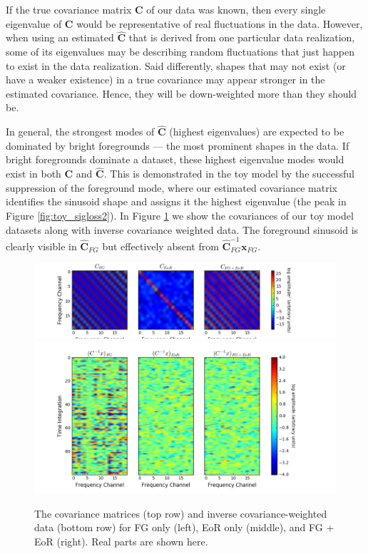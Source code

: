 \documentclass[preprint2,numberedappendix,tighten]{aastex6}  %
\begin{document}
If the true covariance matrix $\textbf{C}$ of our data was known, then every single eigenvalue of $\textbf{C}$ would be representative of real fluctuations in the data. However, when using an estimated $\hat{\textbf{C}}$ that is derived from one particular data realization, some of its eigenvalues may be describing random fluctuations that just happen to exist in the data realization. Said differently, shapes that may not exist (or have a weaker existence) in a true covariance may appear stronger in the estimated covariance. Hence, they will be down-weighted more than they should be.

In general, the strongest modes of $\hat{\textbf{C}}$ (highest eigenvalues) are expected to be dominated by bright foregrounds --- the most prominent shapes in the data. If bright foregrounds dominate a dataset, these highest eigenvalue modes would exist in both $\textbf{C}$ and $\hat{\textbf{C}}$. This is demonstrated in the toy model by the successful suppression of the foreground mode, where our estimated covariance matrix identifies the sinusoid shape and assigns it the highest eigenvalue (the peak in Figure \ref{fig:toy_sigloss2}). In Figure \ref{fig:toy_sigloss12} we show the covariances of our toy model datasets along with inverse covariance weighted data. The foreground sinusoid is clearly visible in $\hat{\textbf{C}}_{FG}$ but effectively absent from $\hat{\textbf{C}}^{-1}_{FG}\textbf{x}_{FG}$.

\begin{figure}
	\centering
	\includegraphics[trim={1.5cm 0.1cm 3.5cm 0.1cm},clip,width=\columnwidth]{plots/toy_sigloss12.png}
	\includegraphics[trim={1.5cm 0.1cm 3.5cm 0.1cm},clip,width=\columnwidth]{plots/toy_sigloss13.png}
	\caption{The covariance matrices (top row) and inverse covariance-weighted data (bottom row) for FG only (left), EoR only (middle), and FG + EoR (right). Real parts are shown here.}
	\label{fig:toy_sigloss12}
\end{figure}
\end{document}
